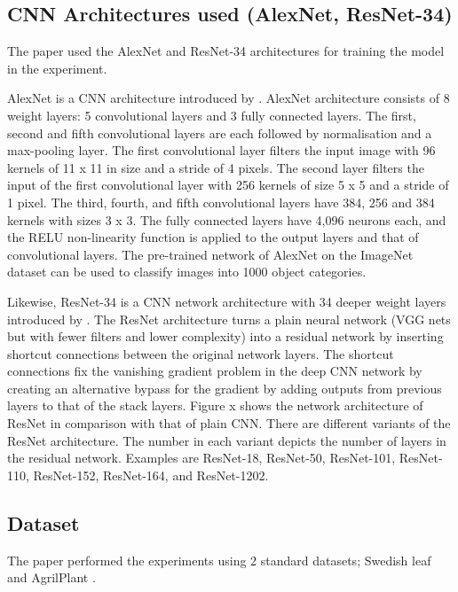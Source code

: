\documentclass[conference]{IEEEtran}
\begin{document}
\subsection{CNN Architectures used (AlexNet, ResNet-34)}
The paper used the AlexNet and ResNet-34 architectures for training the model in the experiment.

AlexNet is a CNN architecture introduced by \cite{krizhevsky2012imagenet}. AlexNet architecture consists of 8 weight layers: 5 convolutional layers and 3 fully connected layers. The first, second and fifth convolutional layers are each followed by normalisation and a max-pooling layer. The first convolutional layer filters the input image with 96 kernels of 11 x 11 in size and a stride of 4 pixels. The second layer filters the input of the first convolutional layer with 256 kernels of size 5 x 5 and a stride of 1 pixel. The third, fourth, and fifth convolutional layers have 384, 256 and 384 kernels with sizes 3 x 3. The fully connected layers have 4,096 neurons each, and the RELU non-linearity function is applied to the output layers and that of convolutional layers.
The pre-trained network of AlexNet on the ImageNet dataset can be used to classify images into 1000 object categories.

Likewise, ResNet-34 is a CNN network architecture with 34 deeper weight layers introduced by \cite{he2016deep}. The ResNet architecture turns a plain neural network (VGG nets but with fewer filters and lower complexity) into a residual network by inserting shortcut connections between the original network layers. The shortcut connections fix the vanishing gradient problem in the deep CNN network by creating an alternative bypass for the gradient by adding outputs from previous layers to that of the stack layers. Figure x shows the network architecture of ResNet in comparison with that of plain CNN.
There are different variants of the ResNet architecture. The number in each variant depicts the number of layers in the residual network. Examples are ResNet-18, ResNet-50, ResNet-101, ResNet-110, ResNet-152, ResNet-164, and ResNet-1202.


\subsection{Dataset}
The paper performed the experiments using 2 standard datasets; Swedish leaf \cite{soderkvist2001computer} and AgrilPlant \cite{pawara2017comparing}.
\end{document}

